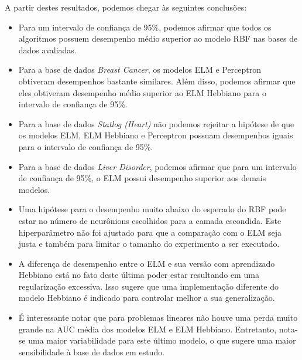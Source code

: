 \documentclass[conference]{IEEEtran}
\begin{document}
	A partir destes resultados, podemos chegar às seguintes conclusões:
	\begin{itemize}
		\item Para um intervalo de confiança de 95\%, podemos afirmar que todos os algoritmos possuem desempenho médio superior ao modelo RBF nas bases de dados avaliadas.
		\item Para a base de dados \textit{Breast Cancer}, os modelos ELM e Perceptron obtiveram desempenhos bastante similares. Além disso, podemos afirmar que eles obtiveram desempenho médio superior ao ELM Hebbiano para o intervalo de confiança de 95\%.
		\item Para a base de dados \textit{Statlog (Heart)} não podemos rejeitar a hipótese de que os modelos ELM, ELM Hebbiano e Perceptron possuam desempenhos iguais para o intervalo de confiança de 95\%.
		\item Para a base de dados \textit{Liver Disorder}, podemos afirmar que para um intervalo de confiança de 95\%, o ELM possui desempenho superior aos demais modelos.
		\item Uma hipótese para o desempenho muito abaixo do esperado do RBF pode estar no número de neurônions escolhidos para a camada escondida. Este hiperparâmetro não foi ajustado para que a comparação com o ELM seja justa e também para limitar o tamanho do experimento a ser executado. 
		\item A diferença de desempenho entre o ELM e sua versão com aprendizado Hebbiano está no fato deste última poder estar resultando em uma regularização excessiva. Isso sugere que uma implementação diferente do modelo Hebbiano é indicado para controlar melhor a sua generalização.
		\item É interessante notar que para problemas lineares não houve uma perda muito grande na AUC média dos modelos ELM e ELM Hebbiano. Entretanto, nota-se uma maior variabilidade para este último modelo, o que sugere uma maior sensibilidade à base de dados em estudo. 
	\end{itemize}
\end{document}
